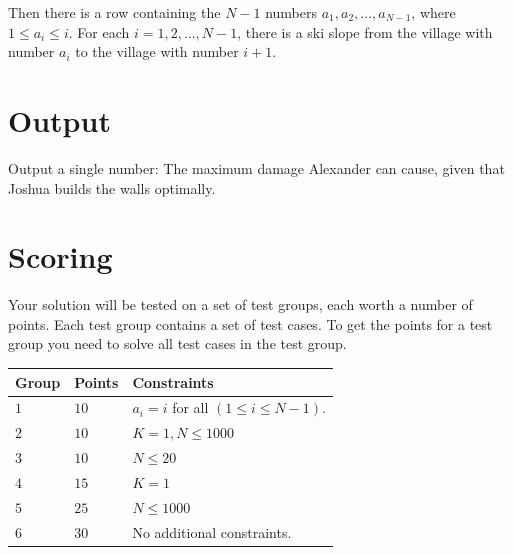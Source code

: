 Then there is a row containing the $N-1$ numbers $a_1, a_2, ..., a_{N-1}$, where $1 \le a_i \le i$.
For each $i = 1, 2, ..., N-1$, there is a ski slope from the village with number $a_i$ to the village with number $i+1$.

\section*{Output}
Output a single number: The maximum damage Alexander can cause, given that Joshua builds the walls optimally.

\section*{Scoring}
Your solution will be tested on a set of test groups, each worth a number of points. Each test group contains
a set of test cases. To get the points for a test group you need to solve all test cases in the test group.

\noindent
\begin{tabular}{| l | l | p{12cm} |}
  \hline
  \textbf{Group} & \textbf{Points} & \textbf{Constraints} \\ \hline
  $1$    & $10$       & $a_i = i$ for all $(1 \le i \le N-1)$. \\ \hline
  $2$    & $10$       & $K = 1, N \le 1000$ \\ \hline
  $3$    & $10$       & $N \le 20$ \\ \hline
  $4$    & $15$       & $K = 1$ \\ \hline
  $5$    & $25$       & $N \leq 1000$ \\ \hline
  $6$    & $30$       & No additional constraints. \\ \hline
\end{tabular}

